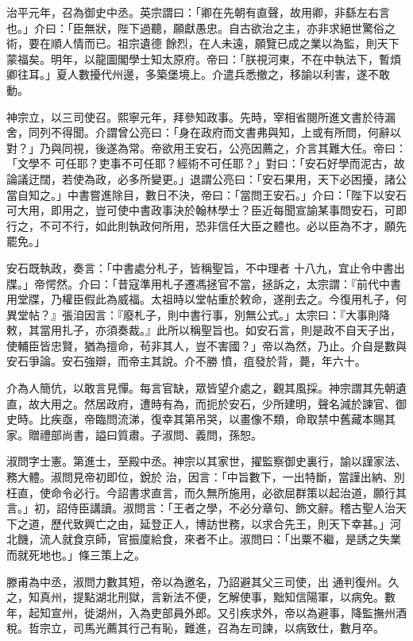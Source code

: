 \begin{pinyinscope}
 治平元年，召為御史中丞。英宗謂曰：「卿在先朝有直聲，故用卿，非繇左右言也。」介曰：「臣無狀，陛下過聽，願獻愚忠。自古欲治之主，亦非求絕世驚俗之術，要在順人情而已。祖宗遺德
 餘烈，在人未遠，願覽已成之業以為監，則天下蒙福矣。明年，以龍圖閣學士知太原府。帝曰：「朕視河東，不在中執法下，暫煩卿往耳。」夏人數擾代州邊，多築堡境上。介遣兵悉撤之，移諭以利害，遂不敢動。



 神宗立，以三司使召。熙寧元年，拜參知政事。先時，宰相省閱所進文書於待漏舍，同列不得聞。介謂曾公亮曰：「身在政府而文書弗與知，上或有所問，何辭以對？」乃與同視，後遂為常。帝欲用王安石，公亮因薦之，介言其難大任。帝曰：「文學不
 可任耶？吏事不可任耶？經術不可任耶？」對曰：「安石好學而泥古，故論議迂闊，若使為政，必多所變更。」退謂公亮曰：「安石果用，天下必困擾，諸公當自知之。」中書嘗進除目，數日不決，帝曰：「當問王安石。」介曰：「陛下以安石可大用，即用之，豈可使中書政事決於翰林學士？臣近每聞宣諭某事問安石，可即行之，不可不行，如此則執政何所用，恐非信任大臣之體也。必以臣為不才，願先罷免。」



 安石既執政，奏言：「中書處分札子，皆稱聖旨，不中理者
 十八九，宜止令中書出牒。」帝愕然。介曰：「昔寇準用札子遷馮拯官不當，拯訴之，太宗謂：『前代中書用堂牒，乃權臣假此為威福。太祖時以堂帖重於敕命，遂削去之。今復用札子，何異堂帖？』張洎因言：『廢札子，則中書行事，別無公式。」太宗曰：『大事則降敕，其當用扎子，亦須奏裁。』此所以稱聖旨也。如安石言，則是政不自天子出，使輔臣皆忠賢，猶為擅命，茍非其人，豈不害國？」帝以為然，乃止。介自是數與安石爭論。安石強辯，而帝主其說。介不勝
 憤，疽發於背，薨，年六十。



 介為人簡伉，以敢言見憚。每言官缺，眾皆望介處之，觀其風採。神宗謂其先朝遺直，故大用之。然居政府，遭時有為，而扼於安石，少所建明，聲名減於諫官、御史時。比疾亟，帝臨問流涕，復幸其第吊哭，以畫像不類，命取禁中舊藏本賜其家。贈禮部尚書，謚曰質肅。子淑問、義問，孫恕。



 淑問字士憲。第進士，至殿中丞。神宗以其家世，擢監察御史裏行，諭以謹家法、務大體。淑問見帝初即位，銳於
 治，因言：「中旨數下，一出特斷，當謹出納、別枉直，使命令必行。今詔書求直言，而久無所施用，必欲屈群策以起治道，願行其言。」初，詔侍臣講讀。淑問言：「王者之學，不必分章句、飾文辭。稽古聖人治天下之道，歷代致興亡之由，延登正人，博訪世務，以求合先王，則天下幸甚。」河北饑，流人就食京師，官振廩給食，來者不止。淑問曰：「出粟不繼，是誘之失業而就死地也。」條三策上之。



 滕甫為中丞，淑問力數其短，帝以為邀名，乃詔避其父三司使，出
 通判復州。久之，知真州，提點湖北刑獄，言新法不便，乞解使事，黜知信陽軍，以病免。數年，起知宣州，徙湖州，入為吏部員外郎。又引疾求外，帝以為避事，降監撫州酒稅。哲宗立，司馬光薦其行己有恥，難進，召為左司諫，以病致仕，數月卒。




\end{pinyinscope}
